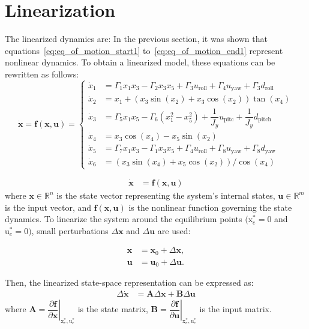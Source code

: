 \documentclass[3p]{elsarticle}
\begin{document}
\section{Linearization}
\label{sec:linearization}
The linearized dynamics are:
In the previous section, it was shown that equations~\eqref{eq:eq_of_motion_start1} to~\eqref{eq:eq_of_motion_end1} represent nonlinear dynamics. To obtain a linearized model, these equations can be rewritten as follows:
\begin{equation}
    \dot{\mathbf{x}} = \mathbf{f}(\mathbf{x}, \mathbf{u}) = \begin{cases}
        \dot x_1& = \Gamma_1x_1x_3 - \Gamma_2x_3x_5 + \Gamma_3 u_{\text{roll}} + \Gamma_4u_{\text{yaw}}+\Gamma_3d_{\text{roll}}\\[2mm]
        \dot x_2 &= x_1 + (x_3\sin(x_2) + x_3\cos(x_2))\tan(x_4)\\
        \dot x_3 &= \Gamma_5x_1x_5 - \Gamma_6(x_1^2-x_5^2) + \dfrac{1}{J_y}u_{\text{pitc}}+ \dfrac{1}{J_y}d_{\text{pitch}}\\
        \dot x_4 &= x_3\cos(x_4) - x_5\sin(x_2)\\[2mm]
        \dot x_5 &= \Gamma_7x_1x_3 - \Gamma_1x_3x_5 + \Gamma_4u_{\text{roll}}+\Gamma_8u_{\text{yaw}}+\Gamma_8d_{\text{yaw}}\\[2mm]
        \dot x_6 &= (x_3\sin(x_4) + x_5\cos(x_2))/\cos(x_4)
    \end{cases}
\end{equation}
    

\begin{align}
\dot{\mathbf{x}} &= \mathbf{f}(\mathbf{x}, \mathbf{u})
\end{align}
where $\mathbf{x} \in \mathbb{R}^n$ is the state vector representing the system's internal states,
$\mathbf{u} \in \mathbb{R}^m$ is the input vector, and
$\mathbf{f}(\mathbf{x}, \mathbf{u})$ is the nonlinear function governing the state dynamics.
To linearize the system around the equilibrium points $(\boldsymbol{{\mathrm{x}}}_e^*\!=\!0$ and $\boldsymbol{{\mathrm{u}}}_e^*\!=\!0)$, small perturbations $\Delta \mathbf{x}$ and $\Delta \mathbf{u}$ are used:

\begin{align}
\mathbf{x} &= \mathbf{x}_0 + \Delta \mathbf{x}, \\
\mathbf{u} &= \mathbf{u}_0 + \Delta \mathbf{u}.
\end{align}

Then, the linearized state-space representation can be expressed as:
\begin{align}
{\Delta \mathbf{\dot x}} &= \mathbf{A} \Delta \mathbf{x} + \mathbf{B} \Delta \mathbf{u}
\end{align}
where
$\mathbf{A} = \left.\dfrac{\partial \mathbf{f}}{\partial \mathbf{x}}\right|_{\boldsymbol{{\mathrm{x}}}_e^*, \boldsymbol{{\mathrm{u}}}_e^*}$ is the state matrix,
$\mathbf{B} = \left.\dfrac{\partial \mathbf{f}}{\partial \mathbf{u}}\right|_{\boldsymbol{{\mathrm{x}}}_e^*, \boldsymbol{{\mathrm{u}}}_e^*}$ is the input matrix.
\end{document}
